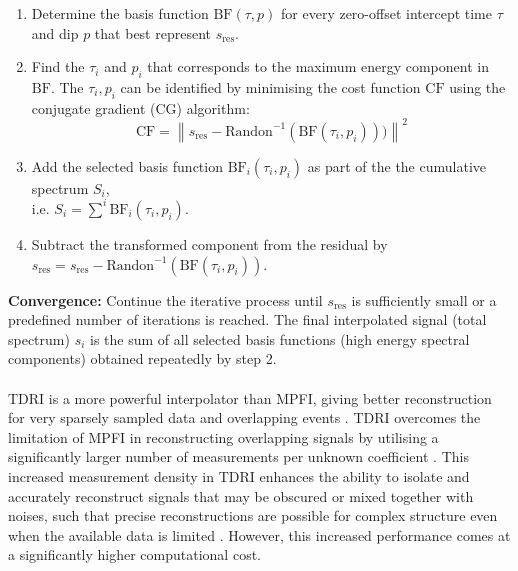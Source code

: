 \begin{enumerate}
	\item Determine the basis function $\mathrm{BF}(\tau,p)$ for every zero-offset intercept time $\tau$ and dip $p$ that best represent $s_{\text{res}}$.
	\item Find the $\tau_i$ and $p_i$ that corresponds to the maximum energy component in $\mathrm{BF}$. The $\tau_i,p_i$ can be identified by minimising the cost function $\mathrm{CF}$ using the conjugate gradient (CG) algorithm: 
	\begin{equation}
		\mathrm{CF}=\left\|s_{\text{res}}-\mathrm{Randon}^{-1}(\mathrm{BF}(\tau_i,p_i)))\right\|^2
		\label{eq:cf2}
	\end{equation}
	\item Add the selected basis function $\mathrm{BF}_i(\tau_i,p_i)$ as part of the the cumulative spectrum $S_i$, \\i.e. $S_i = \sum^i\mathrm{BF}_i(\tau_i,p_i)$.
	\item Subtract the transformed component from the residual by $s_{\text{res}} = s_{\text{res}}-\mathrm{Randon}^{-1}(\mathrm{BF}(\tau_i,p_i))$.
\end{enumerate}
\noindent\textbf{Convergence:} Continue the iterative process until $s_{\text{res}}$ is sufficiently small or a predefined number of iterations is reached. The final interpolated signal (total spectrum) $s_i$ is the sum of all selected basis functions (high energy spectral components) obtained repeatedly by step 2.
\\\\
TDRI is a more powerful interpolator than MPFI, giving better reconstruction for very sparsely sampled data and overlapping events \cite{schlumberger2016}. TDRI overcomes the limitation of MPFI in reconstructing overlapping signals by utilising a significantly larger number of measurements per unknown coefficient \cite{schonewille2014comparison}. This increased measurement density in TDRI enhances the ability to isolate and accurately reconstruct signals that may be obscured or mixed together with noises, such that precise reconstructions are possible for complex structure even when the available data is limited \cite{gu2009radon}. However, this increased performance comes at a significantly higher computational cost.
